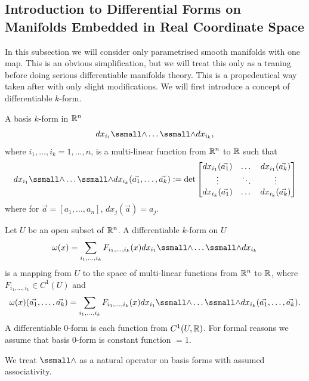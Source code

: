 \documentclass[main.tex]{subfiles}
\begin{document}
\subsection{Introduction to Differential Forms on Manifolds Embedded in Real Coordinate Space}
\label{simplified-manifolds}
In this subsection we will consider only parametrised smooth manifolds with one map. This is an obvious simplification, but we will treat this only as a traning before doing serious differentiable manifolds theory. This is a propedeutical way taken after \cite{colley2012} with only slight modifications.
We will first introduce a concept of differentiable $k$-form.
\begin{definition}
A basis $k$-form in $\mathbb{R}^n$
\begin{equation}
dx_{i_1}\form\dots\form dx_{i_k},
\end{equation}
where $i_1, \dots, i_k = 1,\dots, n$,
is a multi-linear function from $\mathbb{R}^n$ to $\mathbb{R}$ such that 
\begin{equation}
dx_{i_1}\form\dots\form dx_{i_k}(\vec{a_1}, \dots, \vec{a_k}) := 
\det\begin{bmatrix}
dx_{i_1}(\vec{a_1}) & \dots & dx_{i_1}(\vec{a_k}) \\
\vdots & \ddots & \vdots \\
dx_{i_k}(\vec{a_1}) & \dots & dx_{i_k}(\vec{a_k})
\end{bmatrix}
\end{equation}
where for $\vec{a} = [a_1, \dots, a_n]$, $dx_j(\vec{a}) = a_j$.
\end{definition}
\begin{definition}
Let $U$ be an open subset of $\mathbb{R}^n$. A differentiable $k$-form on $U$
\begin{equation}
\omega(x) = \sum_{i_1, \dots, i_k} F_{i_1, \dots, i_k}(x) dx_{i_1}\form\dots\form dx_{i_k}
\end{equation}
is a mapping from $U$ to the space of multi-linear functions from $\mathbb{R}^n$ to $\mathbb{R}$, where $F_{i_1, \dots, i_k}\in C^1(U)$ and 
\begin{equation}
\omega(x)(\vec{a_1}, \dots, \vec{a_k}) = \sum_{i_1, \dots, i_k} F_{i_1, \dots, i_k} (x) dx_{i_1}\form\dots\form dx_{i_k}(\vec{a_1}, \dots, \vec{a_k}).
\end{equation}
A differentiable $0$-form is each function from $C^1(U, \mathbb{R})$. For formal reasons we assume that basis $0$-form is constant function $=1$.
\end{definition}
We treat $\form$ as a natural operator on basis forms with assumed associativity.
\end{document}
